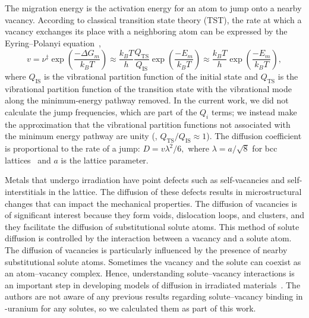 The migration energy is the activation energy for an atom to jump onto a
nearby vacancy. According to classical transition state theory (TST), the rate
at which a vacancy exchanges its place with a neighboring atom can be expressed
by the Eyring--Polanyi
equation~\cite{Eyring1935,Evans1935,vineyard1957frequency},
\begin{equation}
    v = \nu^\ddagger \exp\left(\frac{-\Delta G_m}{k_B T}\right)
      \approx \frac{k_B T}{h} \frac{Q_\text{TS}}{Q_\text{IS}}
              \exp\left(\frac{-E_m}{k_B T}\right)
      \approx \frac{k_B T}{h}
              \exp\left(\frac{-E_m}{k_B T}\right),
\end{equation}
where $Q_\text{IS}$ is the vibrational partition function of the initial
state and $Q_\text{TS}$ is the vibrational partition function of the transition
state with the vibrational mode along the minimum-energy pathway removed.
In the current work, we did not calculate the jump frequencies, which are
part of the $Q_i$ terms; we instead make the approximation that the vibrational
partition functions not associated with the minimum energy pathway are unity
(\ie, $Q_\text{TS}/Q_\text{IS} \approx 1$).
The diffusion coefficient is proportional to the rate of a jump:
$D = v\lambda^2/6,$ where $\lambda = a/\sqrt{8}$ for bcc
lattices~\cite{Heinola2010a} and $a$ is the lattice parameter.


Metals that undergo irradiation have point defects such as self-vacancies and self-interstitials in the lattice. The diffusion of these defects results in microstructural changes that can impact the mechanical properties. The diffusion of vacancies is of significant interest because they form voids, dislocation loops, and clusters, and they facilitate the diffusion of substitutional solute atoms. This method of solute diffusion is controlled by the interaction between a vacancy and a solute atom. The diffusion of vacancies is particularly influenced by the presence of nearby substitutional solute atoms. Sometimes the vacancy and the solute can coexist as an atom--vacancy complex. Hence, understanding solute--vacancy interactions is an important step in developing models of diffusion in irradiated materials~\cite{balluffi1973diffusion, wolverton2007solute}.
The authors are not aware of any previous results regarding solute--vacancy
binding in \textgamma-uranium for any solutes, so we calculated them as part of
this work.

